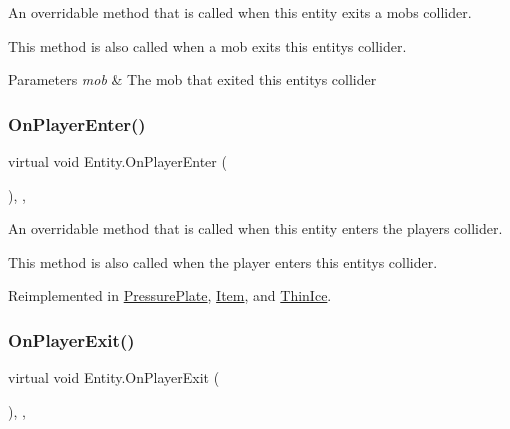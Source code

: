 An overridable method that is called when this entity exits a mob\textquotesingle{}s collider. 

This method is also called when a mob exits this entity\textquotesingle{}s collider. 


\begin{DoxyParams}{Parameters}
{\em mob} & The mob that exited this entity\textquotesingle{}s collider \\
\hline
\end{DoxyParams}
\mbox{\label{class_entity_ad1e2bb09e463c33b64b26ba3306ba2d7}} 
\subsubsection{\texorpdfstring{On\+Player\+Enter()}{OnPlayerEnter()}}
{\footnotesize\ttfamily virtual void Entity.\+On\+Player\+Enter (\begin{DoxyParamCaption}{ }\end{DoxyParamCaption})\hspace{0.3cm}{\ttfamily [inline]}, {\ttfamily [protected]}, {\ttfamily [virtual]}}



An overridable method that is called when this entity enters the player\textquotesingle{}s collider. 

This method is also called when the player enters this entity\textquotesingle{}s collider. 

Reimplemented in \mbox{\hyperlink{class_pressure_plate_a859fa0ce4d9dcfdcc702593ae98afbb0}{Pressure\+Plate}}, \mbox{\hyperlink{class_item_a81c3deb2aa480e2759a9193822d4b7e8}{Item}}, and \mbox{\hyperlink{class_thin_ice_ab8e8cabf76700da05418fa3586b54f4c}{Thin\+Ice}}.

\mbox{\label{class_entity_a32971771be20c0e99a202911b6f311b3}} 
\subsubsection{\texorpdfstring{On\+Player\+Exit()}{OnPlayerExit()}}
{\footnotesize\ttfamily virtual void Entity.\+On\+Player\+Exit (\begin{DoxyParamCaption}{ }\end{DoxyParamCaption})\hspace{0.3cm}{\ttfamily [inline]}, {\ttfamily [protected]}, {\ttfamily [virtual]}}



